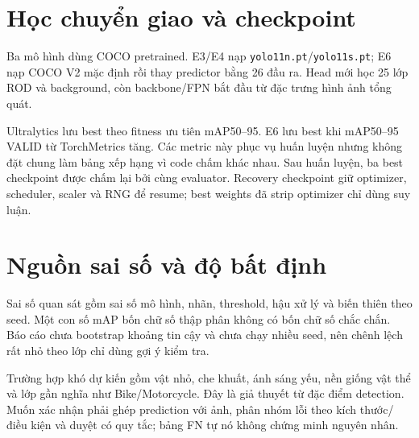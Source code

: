 \section{Học chuyển giao và checkpoint}
Ba mô hình dùng COCO pretrained. E3/E4 nạp \texttt{yolo11n.pt}/\texttt{yolo11s.pt}; E6 nạp COCO V2 mặc định rồi thay predictor bằng 26 đầu ra. Head mới học 25 lớp ROD và background, còn backbone/FPN bắt đầu từ đặc trưng hình ảnh tổng quát.

Ultralytics lưu best theo fitness ưu tiên mAP50--95. E6 lưu best khi mAP50--95 VALID từ TorchMetrics tăng. Các metric này phục vụ huấn luyện nhưng không đặt chung làm bảng xếp hạng vì code chấm khác nhau. Sau huấn luyện, ba best checkpoint được chấm lại bởi cùng evaluator. Recovery checkpoint giữ optimizer, scheduler, scaler và RNG để resume; best weights đã strip optimizer chỉ dùng suy luận.

\section{Nguồn sai số và độ bất định}
Sai số quan sát gồm sai số mô hình, nhãn, threshold, hậu xử lý và biến thiên theo seed. Một con số mAP bốn chữ số thập phân không có bốn chữ số chắc chắn. Báo cáo chưa bootstrap khoảng tin cậy và chưa chạy nhiều seed, nên chênh lệch rất nhỏ theo lớp chỉ dùng gợi ý kiểm tra.

Trường hợp khó dự kiến gồm vật nhỏ, che khuất, ánh sáng yếu, nền giống vật thể và lớp gần nghĩa như Bike/Motorcycle. Đây là giả thuyết từ đặc điểm detection. Muốn xác nhận phải ghép prediction với ảnh, phân nhóm lỗi theo kích thước/điều kiện và duyệt có quy tắc; bảng FN tự nó không chứng minh nguyên nhân.

